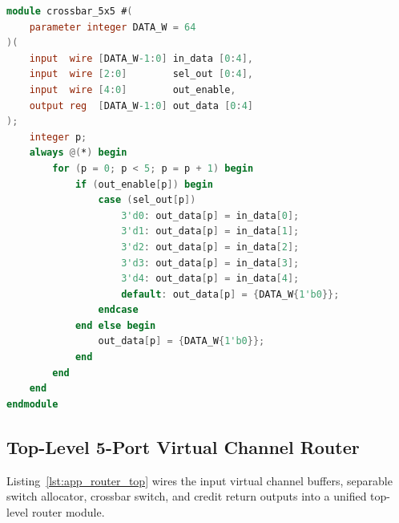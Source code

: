 \begin{lstlisting}[language=Verilog, caption={Synthesizable 5-Port Full Crossbar (\texttt{crossbar\_5x5.sv})}, label={lst:app_crossbar}]
module crossbar_5x5 #(
    parameter integer DATA_W = 64
)(
    input  wire [DATA_W-1:0] in_data [0:4],
    input  wire [2:0]        sel_out [0:4],
    input  wire [4:0]        out_enable,
    output reg  [DATA_W-1:0] out_data [0:4]
);
    integer p;
    always @(*) begin
        for (p = 0; p < 5; p = p + 1) begin
            if (out_enable[p]) begin
                case (sel_out[p])
                    3'd0: out_data[p] = in_data[0];
                    3'd1: out_data[p] = in_data[1];
                    3'd2: out_data[p] = in_data[2];
                    3'd3: out_data[p] = in_data[3];
                    3'd4: out_data[p] = in_data[4];
                    default: out_data[p] = {DATA_W{1'b0}};
                endcase
            end else begin
                out_data[p] = {DATA_W{1'b0}};
            end
        end
    end
endmodule
\end{lstlisting}

\subsection{Top-Level 5-Port Virtual Channel Router}
Listing~\ref{lst:app_router_top} wires the input virtual channel buffers, separable switch allocator, crossbar switch, and credit return outputs into a unified top-level router module.


